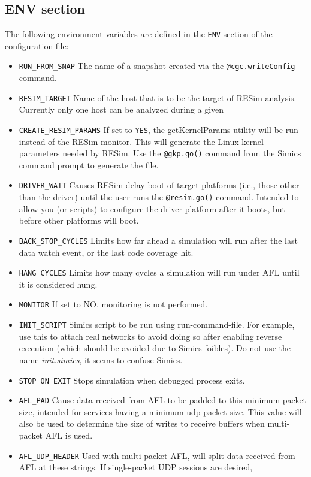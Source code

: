 \documentclass[titlepage]{article}
\begin{document}
\subsection{ENV section}
\label{env}
The following environment variables are defined in the {\tt ENV} section of the configuration file:
\begin{itemize}
\item {\tt RUN\_FROM\_SNAP} The name of a snapshot created via the {\tt @cgc.writeConfig} command.
\item {\tt RESIM\_TARGET} Name of the host that is to be the target of RESim analysis.  Currently only one host can be analyzed during a given
\item {\tt CREATE\_RESIM\_PARAMS} If set to {\tt YES}, the getKernelParams utility will be run instead of the RESim monitor.  This will
generate the Linux kernel parameters needed by RESim.  Use the {\tt @gkp.go()} command from the Simics command prompt to generate the file.
\item {\tt DRIVER\_WAIT} Causes RESim delay boot of target platforms (i.e., those other than the driver) until the 
user runs the {\tt @resim.go()} command.  Intended to allow you (or scripts)
to configure the driver platform after it boots, but before other platforms will boot.
\item {\tt BACK\_STOP\_CYCLES} Limits how far ahead a simulation will run after the last data watch event, or the last code coverage hit.
\item {\tt HANG\_CYCLES} Limits how many cycles a simulation will run under AFL until it is considered hung.
\item {\tt MONITOR} If set to NO, monitoring is not performed.
\item{\tt INIT\_SCRIPT} Simics script to be run using run-command-file.  For example, use this to attach real networks to avoid
doing so after enabling reverse execution (which should be avoided due to Simics foibles).  Do not use the name \textit{init.simics}, it seems
to confuse Simics.
\item {\tt STOP\_ON\_EXIT} Stops simulation when debugged process exits.
\item{\tt AFL\_PAD} Cause data received from AFL to be padded to this minimum packet size, intended for services having a minimum udp packet size.
This value will also be used to determine the size of writes to receive buffers when multi-packet AFL is used.
\item{\tt AFL\_UDP\_HEADER} Used with multi-packet AFL, will split data received from AFL at these strings.  If single-packet UDP sessions are desired,

\end{itemize}
\end{document}

